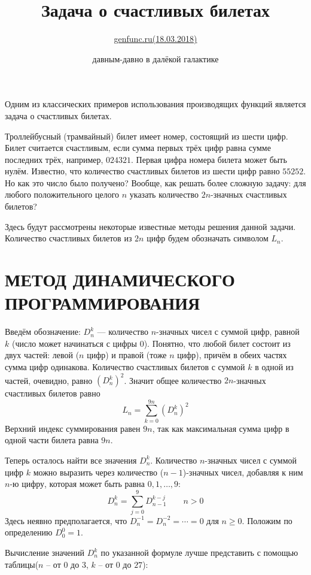 \documentclass[12pt, letterpaper]{extarticle}
\title{\textbf{Задача о счастливых билетах}}
\author{\href{https://web.archive.org/web/20170629072301/http://www.genfunc.ru/theory/oper/}{genfunc.ru(18.03.2018)}}
\date{давным-давно в далёкой галактике}
\begin{document}
\maketitle
Одним из классических примеров использования производящих функций является задача о счастливых билетах.

Троллейбусный (трамвайный) билет имеет номер, состоящий из шести цифр. Билет считается счастливым, если сумма первых трёх цифр равна сумме последних трёх, например, $024321$. Первая цифра номера билета может быть нулём. Известно, что количество счастливых билетов из шести цифр равно $55252$. Но как это число было получено? Вообще, как решать более сложную задачу: для любого положительного целого $n$ указать количество $2n$-значных счастливых билетов?

Здесь будут рассмотрены некоторые известные методы решения данной задачи. Количество счастливых билетов из $2n$ цифр будем обозначать символом $L_n$.
\section{МЕТОД ДИНАМИЧЕСКОГО ПРОГРАММИРОВАНИЯ}

Введём обозначение: $D_n^k$ — количество $n$-значных чисел с суммой цифр, равной $k$ (число может начинаться с цифры $0$). Понятно, что любой билет состоит из двух частей: левой ($n$ цифр) и правой (тоже $n$ цифр), причём в обеих частях сумма цифр одинакова. Количество счастливых билетов с суммой $k$ в одной из частей, очевидно, равно $(D_n^k)^2$. Значит общее количество $2n$-значных счастливых билетов равно
\[L_n = \sum_{k=0}^{9n} (D_{n}^{k})^2\]
Верхний индекс суммирования равен $9n$, так как максимальная сумма цифр в одной части билета равна $9n$.

Теперь осталось найти все значения $D_n^k$. Количество $n$-значных чисел с суммой цифр $k$ можно выразить через количество ($n-1$)-значных чисел, добавляя к ним $n$-ю цифру, которая может быть равна $0, 1, \dotsc, 9$:
\[D_n^k = \sum_{j=0}^{9} D_{n-1}^{k-j} \qquad n>0\]
Здесь неявно предполагается, что $D_n^{-1}=D_n^{-2}=\dotsb=0$ для $n\geq0$. Положим по определению $D_0^0=1$.

Вычисление значений $D_n^k$ по указанной формуле лучше представить с помощью таблицы($n$ -- от $0$ до $3$, $k$ -- от $0$ до $27$):
\end{document}

